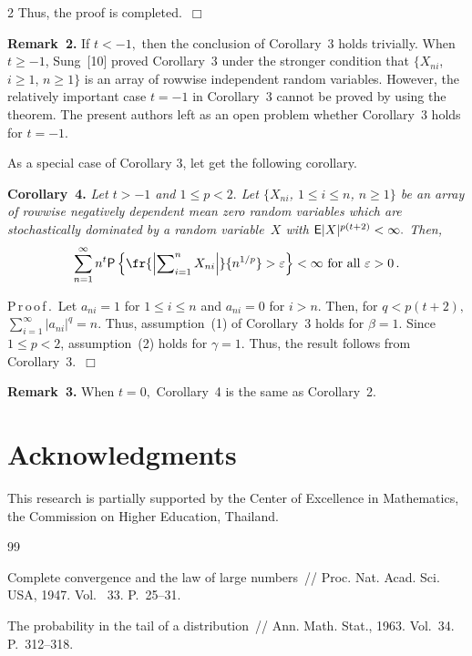 \begin{multicols}{2}
Thus, the proof is completed.\hfill~$\Box$

\medskip
\noindent 
\textbf{Remark~2.} If $t<-1,$ then the conclusion of Corollary~3 holds trivially. When 
$t\ge -1$, Sung~[10] proved Corollary~3 under the stronger condition that $\{X_{ni}$, $i\ge 1$, $n\ge 1\}$ is an 
array  of rowwise
independent random variables. However, the relatively important case $t=-1$ in 
Corollary~3 cannot be proved by
using the theorem. The present authors left as an open problem whether Corollary~3 holds for $t=-1$.

\medskip
As a special case of Corollary 3, let get the following corollary.

\medskip

\noindent 
\textbf{Corollary~4.} \textit{Let $t>-1$ and $1\le p<2.$ 
Let $\{X_{ni}$, $1\le i \le n$, $n\ge 1\}$ be an array
of rowwise negatively dependent  mean zero random variables which are stochastically dominated by a random
variable~$X$ with ${\sf E}|X|^{p(t+2)}<\infty.$ Then,}
$$
\sum\limits_{n=1}^\infty n^t {\sf P}\left\{ \fr{\left|\sum\nolimits_{i=1}^n X_{ni}\right|}{n^{1/p}}>
\varepsilon\right\}<\infty
\mbox{ for all } \varepsilon>0\,.
$$

\noindent 
P\,r\,o\,o\,f\,.\ Let $a_{ni}=1$ for $1\le i\le n$ and $a_{ni}=0$ for $i>n.$ 
Then, for $q<p(t+2),$
$\sum\limits_{i=1}^\infty |a_{ni}|^q=n.$ Thus, assumption~(1) of Corollary~3 holds for 
$\beta=1$. Since $1\le p<2$,
assumption~(2) holds for $\gamma=1$. Thus, the result follows from Corollary~3.\hfill~$\Box$

\medskip

\noindent 
\textbf{Remark~3.} When $t=0,$  Corollary~4 is the same as Corollary~2.

\section*{Acknowledgments} 

\noindent
This research is partially supported by the 
Center of Excellence in Mathematics, the Commission on Higher Education, Thailand.

  {\small\frenchspacing
{%
\begin{thebibliography}{99}

Complete convergence and the law of large numbers~// Proc. Nat. Acad. Sci. USA, 1947.
Vol.~ 33. P.~25--31.

  The probability in the tail of a distribution~//
Ann. Math. Stat., 1963. Vol.~34. P.~312--318.


\end{thebibliography}}}
\end{multicols}
